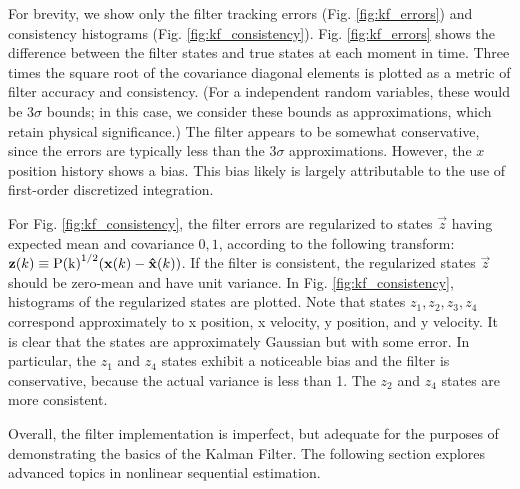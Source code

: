 For brevity, we show only the filter tracking errors (Fig. \ref{fig:kf_errors}) and consistency histograms (Fig. \ref{fig:kf_consistency}).
Fig. \ref{fig:kf_errors} shows the difference between the filter states and true states at each moment in time.
Three times the square root of the covariance diagonal elements is plotted as a metric of filter accuracy and consistency.
(For a independent random variables, these would be $3\sigma$ bounds; in this case, we consider these bounds as approximations, which retain physical significance.)
The filter appears to be somewhat conservative, since the errors are typically less than the $3\sigma$ approximations.
However, the $x$ position history shows a bias.
This bias likely is largely attributable to the use of first-order discretized integration.

For Fig. \ref{fig:kf_consistency}, the filter errors are regularized to states $\vec{z}$ having expected mean and covariance $0,1$, according to the following transform: $\mathrm{\mathbf{z}}(k) \equiv \mathrm{P(k)}^{1/2}(\mathrm{\mathbf{x}}(k)-\mathrm{\mathbf{\hat{x}}}(k))$.
If the filter is consistent, the regularized states $\vec{z}$ should be zero-mean and have unit variance.
In Fig. \ref{fig:kf_consistency}, histograms of the regularized states are plotted.
Note that states $z_1,z_2,z_3,z_4$ correspond approximately to x position, x velocity, y position, and y velocity.
It is clear that the states are approximately Gaussian but with some error.
In particular, the $z_1$ and $z_4$ states exhibit a noticeable bias and the filter is conservative, because the actual variance is less than 1.
The $z_2$ and $z_4$ states are more consistent.

Overall, the filter implementation is imperfect, but adequate for the purposes of demonstrating the basics of the Kalman Filter.
The following section explores advanced topics in nonlinear sequential estimation.